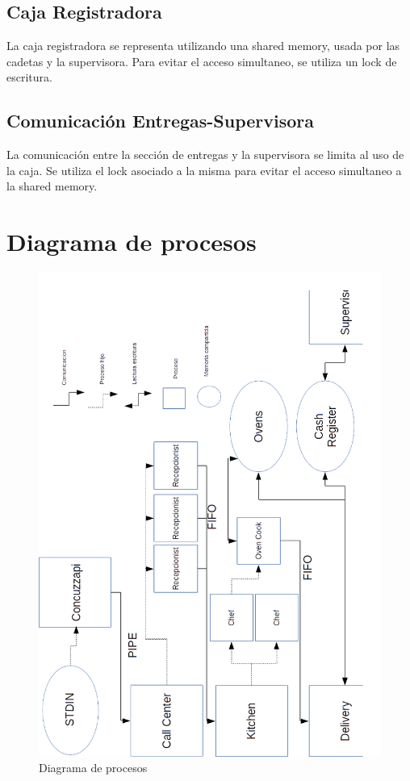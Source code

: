 \documentclass[11pt,spanish,a4paper,openany,notitlepage]{article}
\begin{document}
\subsection{Caja Registradora}

La caja registradora se representa utilizando una shared memory, usada por las cadetas y la 
supervisora. Para evitar el acceso simultaneo, se utiliza un lock de escritura.

\subsection{Comunicación Entregas-Supervisora}

La comunicación entre la sección de entregas y la supervisora se limita al uso de la caja. Se 
utiliza el lock asociado a la misma para evitar el acceso simultaneo a la shared memory.

\newpage

\section{Diagrama de procesos}

\begin{figure}[H]
\begin{center}
\includegraphics[width=380pt]{./informe/Modelo-de-procesos.png}
\caption{Diagrama de procesos}
\end{center}
\end{figure}
\end{document}
